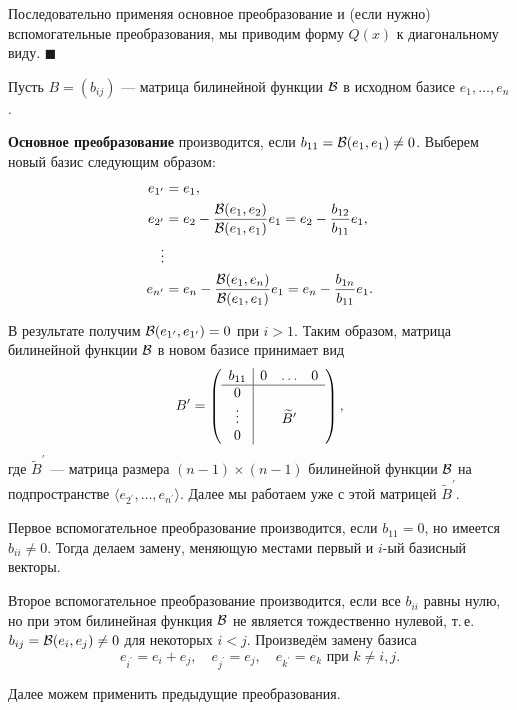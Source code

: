 Последовательно применяя основное преобразование и (если нужно) вспомогательные преобразования, мы приводим форму $Q(x)$ к диагональному виду.
\hfill$\blacksquare$\par\smallskip

\smallskip
{}
Пусть $B = (b_{ij})$ --- матрица билинейной функции $\mathcal{B}$ в исходном базисе $e_1, \ldots, e_n$.

\textbf{Основное преобразование} производится, если $b_{11} = \mathcal{B}(e_1, e_1) \ne 0$. Выберем новый базис следующим образом:
\begin{align*}
    e_{1^\prime} &= e_1,\\
    e_{2^\prime} &= e_2 - \frac{\mathcal{B}(e_1, e_2)}{\mathcal{B}(e_1, e_1)}e_1 = e_2 - \frac{b_{12}}{b_{11}}e_1,\\
    \vdots\\
    e_{n^\prime} &= e_n - \frac{\mathcal{B}(e_1, e_n)}{\mathcal{B}(e_1, e_1)}e_1 = e_n - \frac{b_{1n}}{b_{11}}e_1.
\end{align*}

В результате получим $\mathcal{B}(e_{1^\prime}, e_{1^\prime}) = 0$ при $i > 1$. Таким образом, матрица билинейной функции $\mathcal{B}$ в новом базисе принимает вид
\[
    B^\prime =
    \left(
    \begin{array}{c | c c c}
        b_{11} & 0 & \ldots & 0\\
        \hline
        0 & & & \\
        \vdots & & \widetilde{B}^\prime & \\
        0 & & & 
    \end{array}
    \right),
\]
где $\widetilde{B}^\prime$ --- матрица размера $(n - 1) \times (n - 1)$ билинейной функции $\mathcal{B}$ на подпространстве $\langle e_{2^\prime}, \ldots, e_{n^\prime} \rangle$. Далее мы работаем уже с этой матрицей $\widetilde{B}^\prime$.

Первое вспомогательное преобразование производится, если $b_{11} = 0$, но имеется $b_{ii} \ne 0$. Тогда делаем замену, меняющую местами первый и $i$-ый базисный векторы.

Второе вспомогательное преобразование производится, если все $b_{ii}$ равны нулю, но при этом билинейная функция $\mathcal{B}$ не является тождественно нулевой, т.\,е. $b_{ij} = \mathcal{B}(e_i, e_j) \ne 0$ для некоторых $i < j$. Произведём замену базиса
\[
    e_{i^\prime} = e_i + e_j,\quad e_{j^\prime} = e_j,\quad e_{k^\prime} = e_k\text{ при $k \ne i, j$}.
\]

Далее можем применить предыдущие преобразования.

